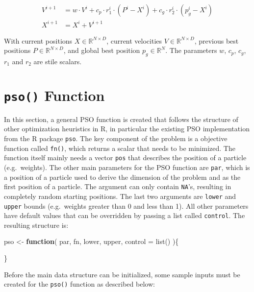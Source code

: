 \documentclass[
  oneside]{book}
\newenvironment{Shaded}{\begin{snugshade}}{\end{snugshade}}
\newcommand{\AttributeTok}[1]{\textcolor[rgb]{0.77,0.63,0.00}{#1}}
\newcommand{\ControlFlowTok}[1]{\textcolor[rgb]{0.13,0.29,0.53}{\textbf{#1}}}
\newcommand{\FunctionTok}[1]{\textcolor[rgb]{0.00,0.00,0.00}{#1}}
\newcommand{\NormalTok}[1]{#1}
\newcommand{\OtherTok}[1]{\textcolor[rgb]{0.56,0.35,0.01}{#1}}
\begin{document}
\begin{align*}
  V^{i+1} &= w \cdot V^{i} + c_p \cdot r_1^i \cdot (P^i-X^i) + c_g \cdot r_2^i \cdot (p_g^i - X^i) \\
  X^{i+1} &= X^i + V^{i+1}
\end{align*}

With current positions \(X \in \mathbb{R}^{N \times D}\), current velocities \(V \in \mathbb{R}^{N \times D}\), previous best positions \(P \in \mathbb{R}^{N \times D}\), and global best position \(p_g \in \mathbb{R}^{N}\). The parameters \(w\), \(c_p\), \(c_g\), \(r_1\) and \(r_2\) are stile scalars.

\hypertarget{pso-function}{%
\section{\texorpdfstring{\texttt{pso()} Function}{pso() Function}}\label{pso-function}}

In this section, a general PSO function is created that follows the structure of other optimization heuristics in R, in particular the existing PSO implementation from the R package \texttt{pso}. The key component of the problem is a objective function called \texttt{fn()}, which returns a scalar that needs to be minimized. The function itself mainly needs a vector \texttt{pos} that describes the position of a particle (e.g.~weights). The other main parameters for the PSO function are \texttt{par}, which is a position of a particle used to derive the dimension of the problem and as the first position of a particle. The argument can only contain \texttt{NA}'s, resulting in completely random starting positions. The last two arguments are \texttt{lower} and \texttt{upper} bounds (e.g.~weights greater than 0 and less than 1). All other parameters have default values that can be overridden by passing a list called \texttt{control}. The resulting structure is:

\begin{Shaded}
\begin{Highlighting}[]
\NormalTok{pso }\OtherTok{\textless{}{-}} \ControlFlowTok{function}\NormalTok{(}
\NormalTok{    par, }
\NormalTok{    fn, }
\NormalTok{    lower, }
\NormalTok{    upper, }
    \AttributeTok{control =} \FunctionTok{list}\NormalTok{()}
\NormalTok{  )\{}

\NormalTok{\}}
\end{Highlighting}
\end{Shaded}

Before the main data structure can be initialized, some sample inputs must be created for the \texttt{pso()} function as described below:
\end{document}
